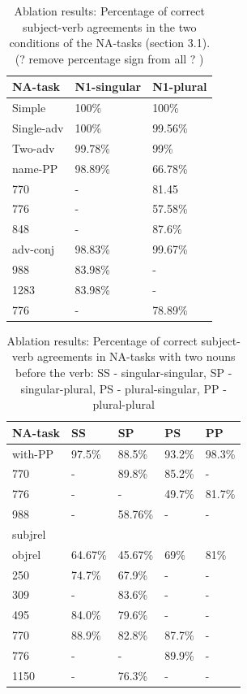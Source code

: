 \begin{table}[h!]
\centering
\begin{tabular}{|P{2cm}||P{2cm}|P{2cm}|}
\hline
\B NA-task & \B N1-singular & \B N1-plural \\
\hline
\hline
\B Simple & 100\% & 100\% \\
\B Single-adv & 100\% & 99.56\% \\
\B Two-adv & 99.78\% & 99\% \\
\B name-PP & 98.89\% & 66.78\% \\
770 & - & 81.45 \\
776 & - & 57.58\% \\
848 & - & 87.6\% \\
\B adv-conj & 98.83\% & 99.67\% \\ 
988 & 83.98\% & - \\
1283 & 83.98\% & - \\
776 & - & 78.89\% \\
\hline
\end{tabular}
\caption{Ablation results: Percentage of correct subject-verb agreements in the two conditions of the NA-tasks (section 3.1). (? remove percentage sign from all ? )}
\end{table}

\begin{table}[h!]
\centering
\begin{tabular}{|P{1.8cm}||P{1cm}|P{1cm}|P{1cm}|P{1cm}|}
 \hline
\B NA-task & \B SS & \B SP & \B PS & \B PP\\
\hline
\hline
\B with-PP & 97.5\% & 88.5\% & 93.2\% & 98.3\% \\
770 & - & 89.8\% & 85.2\% & - \\
776 & - & - & 49.7\% & 81.7\% \\
988 & - & 58.76\% & - & - \\
\B subjrel & & & & \\

\B objrel & 64.67\% & 45.67\% & 69\% & 81\%\\
250 & 74.7\% & 67.9\% & - & - \\
309 & - & 83.6\% & - & - \\
495 & 84.0\% & 79.6\% & - & - \\
770 & 88.9\% & 82.8\% & 87.7\% & - \\
776 & - & - & 89.9\% & - \\
1150 & - & 76.3\% & - & - \\
\hline
\end{tabular}
\caption{Ablation results: Percentage of correct subject-verb agreements in NA-tasks with two nouns before the verb: SS - singular-singular, SP - singular-plural, PS - plural-singular, PP - plural-plural}
\end{table}


